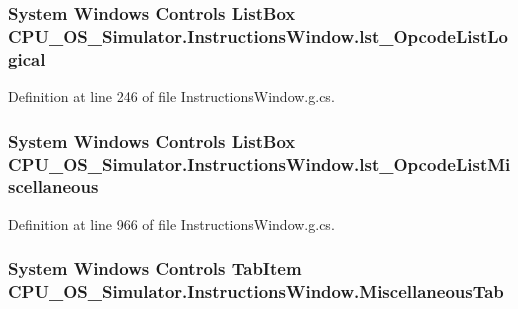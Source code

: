 \subsubsection[{lst\+\_\+\+Opcode\+List\+Logical}]{\setlength{\rightskip}{0pt plus 5cm}System Windows Controls List\+Box C\+P\+U\+\_\+\+O\+S\+\_\+\+Simulator.\+Instructions\+Window.\+lst\+\_\+\+Opcode\+List\+Logical\hspace{0.3cm}{\ttfamily [package]}}\label{class_c_p_u___o_s___simulator_1_1_instructions_window_a61ee2cb0ba7197963b1138848778cd3c}


Definition at line 246 of file Instructions\+Window.\+g.\+cs.

\hypertarget{class_c_p_u___o_s___simulator_1_1_instructions_window_a3ac59be147d3323d2b485551b3a3640a}{}
\subsubsection[{lst\+\_\+\+Opcode\+List\+Miscellaneous}]{\setlength{\rightskip}{0pt plus 5cm}System Windows Controls List\+Box C\+P\+U\+\_\+\+O\+S\+\_\+\+Simulator.\+Instructions\+Window.\+lst\+\_\+\+Opcode\+List\+Miscellaneous\hspace{0.3cm}{\ttfamily [package]}}\label{class_c_p_u___o_s___simulator_1_1_instructions_window_a3ac59be147d3323d2b485551b3a3640a}


Definition at line 966 of file Instructions\+Window.\+g.\+cs.

\hypertarget{class_c_p_u___o_s___simulator_1_1_instructions_window_ab7e1bbdc8bb2830d39fb9a4339aa27f2}{}
\subsubsection[{Miscellaneous\+Tab}]{\setlength{\rightskip}{0pt plus 5cm}System Windows Controls Tab\+Item C\+P\+U\+\_\+\+O\+S\+\_\+\+Simulator.\+Instructions\+Window.\+Miscellaneous\+Tab\hspace{0.3cm}{\ttfamily [package]}}\label{class_c_p_u___o_s___simulator_1_1_instructions_window_ab7e1bbdc8bb2830d39fb9a4339aa27f2}


